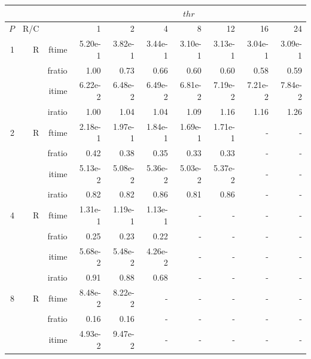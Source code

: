 \documentclass[a4paper]{article}
\begin{document}
\begin{table}[htbp]
\begin{center}
\begin{small}
\begin{tabular}{|r|r|r|r|r|r|r|r|r|r|}
\hline 
     & & & \multicolumn{7}{c|}{$thr$} \\ \hline
    $P$ & R/C &  & 1           & 2    & 4    & 8    & 12   & 16    & 24  \\ \hline\hline
   1 &  R &   ftime &    5.20e-1 &    3.82e-1 &    3.44e-1 &    3.10e-1 &    3.13e-1 &    3.04e-1 &    3.09e-1 \\
             &             &  fratio &    1.00 &    0.73 &    0.66 &    0.60 &    0.60 &    0.58 &    0.59 \\
             &             &  itime &    6.22e-2 &    6.48e-2 &    6.49e-2 &    6.81e-2 &    7.19e-2 &    7.21e-2 &    7.84e-2 \\
             &             &  iratio &    1.00 &    1.04  &    1.04  &    1.09  &    1.16  &    1.16  &    1.26  \\\hline
   2 &  R &   ftime &    2.18e-1 &    1.97e-1 &    1.84e-1 &    1.69e-1 &    1.71e-1 &      - &      - \\
             &             &  fratio &   0.42 &    0.38 &    0.35 &    0.33 &    0.33 &      - &      - \\
             &             &  itime &    5.13e-2 &    5.08e-2 &    5.36e-2 &    5.03e-2 &    5.37e-2 &      - &      - \\
             &             &  iratio &    0.82 &   0.82 &    0.86 &   0.81 &    0.86 &      - &      - \\\hline
   4 &  R &   ftime &    1.31e-1 &    1.19e-1 &    1.13e-1 &      - &      - &      - &      - \\
             &             &  fratio &    0.25 &    0.23 &   0.22 &      - &      - &      - &      - \\
             &             &  itime &    5.68e-2 &    5.48e-2 &    4.26e-2 &      - &      - &      - &      - \\
             &             &  iratio &    0.91 &    0.88 &    0.68 &      - &      - &      - &      - \\\hline
   8 &   R &   ftime &    8.48e-2 &    8.22e-2 &      - &      - &      - &      - &      - \\
             &             &  fratio &    0.16 &    0.16 &      - &      - &      - &      - &      - \\
             &             &  itime &    4.93e-2 &    9.47e-2 &      - &      - &      - &      - &      - \\

\end{tabular}
\end{small}
\end{center}
\end{table}
\end{document}
